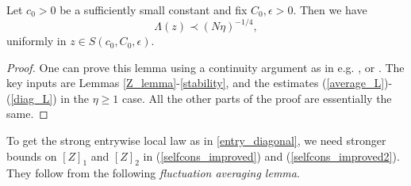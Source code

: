 \begin{lemma}\label{alem_weak} 
Let $c_0>0$ be a sufficiently small constant and fix $C_0,\epsilon>0$. Then we have %
\begin{equation} \label{localweakm}
\Lambda(z) \prec (N\eta)^{-1/4},
\end{equation}
uniformly in $z \in S(c_0,C_0,\epsilon)$.
\end{lemma}
\begin{proof}
One can prove this lemma using a continuity argument as in e.g. \cite[Section 4.1]{isotropic}, \cite[Section 5.3]{Semicircle} or \cite[Section 3.6]{EKYY1}. The key inputs are Lemmas \ref{Z_lemma}-\ref{stability}, and the estimates (\ref{average_L})-(\ref{diag_L}) in the $\eta \ge 1$ case. All the other parts of the proof are essentially the same. 
\end{proof}

To get the strong entrywise local law as in \eqref{entry_diagonal}, we need stronger bounds on $[Z]_1$ and $[Z]_2$ in (\ref{selfcons_improved}) and (\ref{selfcons_improved2}). They follow from the following {\it{fluctuation averaging lemma}}. 

